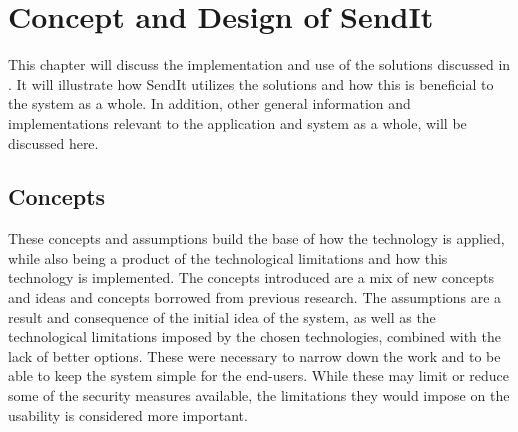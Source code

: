 %
\chapter{Concept and Design of SendIt} %
%
			
	
	
	
		
		


	



	


\label{Chapter3} %
%
This chapter will discuss the implementation and use of the solutions discussed in . It will illustrate how SendIt utilizes the solutions and how this is beneficial to the system as a whole. In addition, other general information and implementations relevant to the application and system as a whole, will be discussed here.

%
\section{Concepts}
These concepts and assumptions build the base of how the technology is applied, while also being a product of the technological limitations and how this technology is implemented. The concepts introduced are a mix of new concepts and ideas and concepts borrowed from previous research. The assumptions are a result and consequence of the initial idea of the system, as well as the technological limitations imposed by the chosen technologies, combined with the lack of better options. These were necessary to narrow down the work and to be able to keep the system simple for the end-users. While these may limit or reduce some of the security measures available, the limitations they would impose on the usability is considered more important.


